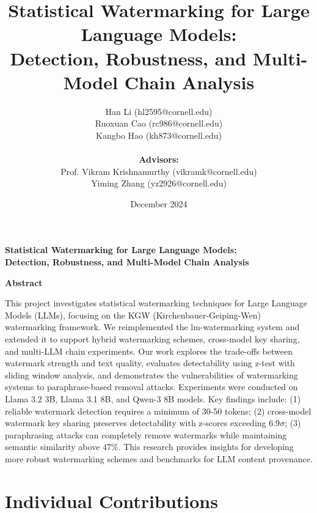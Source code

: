 \documentclass[12pt,letterpaper]{article}
\title{\textbf{Statistical Watermarking for Large Language Models:\\
Detection, Robustness, and Multi-Model Chain Analysis}}
\author{
    Han Li (hl2595@cornell.edu)\\
    Ruoxuan Cao (rc986@cornell.edu)\\
    Kangbo Hao (kh873@cornell.edu)\\
    \\
    \textbf{Advisors:}\\
    Prof. Vikram Krishnamurthy (vikramk@cornell.edu)\\
    Yiming Zhang (yz2926@cornell.edu)
}
\date{December 2024}
\begin{document}
\maketitle
\thispagestyle{empty}
\newpage

\begin{center}
\textbf{\Large Statistical Watermarking for Large Language Models:\\
Detection, Robustness, and Multi-Model Chain Analysis}

\vspace{1cm}
\textbf{Abstract}
\end{center}

\noindent
This project investigates statistical watermarking techniques for Large Language Models (LLMs), focusing on the KGW (Kirchenbauer-Geiping-Wen) watermarking framework. We reimplemented the lm-watermarking system and extended it to support hybrid watermarking schemes, cross-model key sharing, and multi-LLM chain experiments. Our work explores the trade-offs between watermark strength and text quality, evaluates detectability using z-test with sliding window analysis, and demonstrates the vulnerabilities of watermarking systems to paraphrase-based removal attacks. Experiments were conducted on Llama 3.2 3B, Llama 3.1 8B, and Qwen-3 8B models. Key findings include: (1) reliable watermark detection requires a minimum of 30-50 tokens; (2) cross-model watermark key sharing preserves detectability with z-scores exceeding 6.9$\sigma$; (3) paraphrasing attacks can completely remove watermarks while maintaining semantic similarity above 47\%. This research provides insights for developing more robust watermarking schemes and benchmarks for LLM content provenance.

\newpage

\section*{Individual Contributions}
\end{document}
